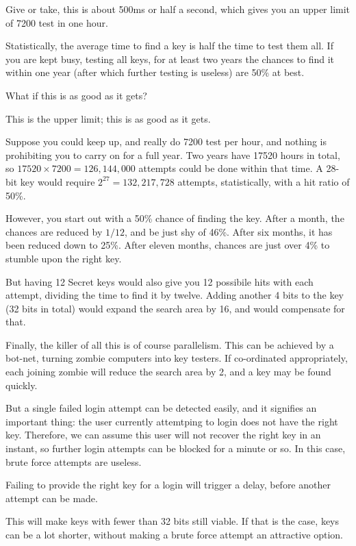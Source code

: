 Give or take, this is about 500ms or half a second,
which gives you an upper limit of 7200 test in one hour.
\par
Statistically, the average time to find a key is half the time to test them all.
If you are kept busy, testing all keys, for at least two years the chances to find it within one year
(after which further testing is useless)
are 50\% at best.
\begin{dialogue}
	What if this is as good as it gets?
\end{dialogue}
This is the upper limit; this is as good as it gets.
\par
Suppose you could keep up, and really do 7200 test per hour, and nothing is prohibiting you to carry on for a full year.
Two years have 17520 hours in total,
so $17520\times 7200=126,144,000$ attempts could be done within that time.
A 28-bit key would require $2^{27}=132,217,728$ attempts, statistically, with a hit ratio of 50\%.
\par
However, you start out with a 50\% chance of finding the key.
After a month, the chances are reduced by $1/12$, and be just shy of 46\%.
After six months, it has been reduced down to 25\%.
After eleven months, chances are just over 4\% to stumble upon the right key.
\par
But having 12 Secret keys would also give you 12 possibile hits with each attempt,
dividing the time to find it by twelve.
Adding another 4 bits to the key
(32 bits in total)
would expand the search area by 16, and would compensate for that.
\par
Finally, the killer of all this is of course parallelism.
This can be achieved by a bot-net, turning zombie computers into key testers.
If co-ordinated appropriately, each joining zombie will reduce the search area by 2, and a key may be found quickly.
\par
But a single failed login attempt can be detected easily, and it signifies an important thing:
the user currently attemtping to login does not have the right key.
Therefore, we can assume this user will not recover the right key in an instant,
so further login attempts can be blocked for a minute or so.
In this case, brute force attempts are useless.
\begin{moafu}
Failing to provide the right key for a login will trigger a delay,
before another attempt can be made.
\end{moafu}
This will make keys with fewer than 32 bits still viable.
If that is the case,
keys can be a lot shorter,
without making a brute force attempt an attractive option.

